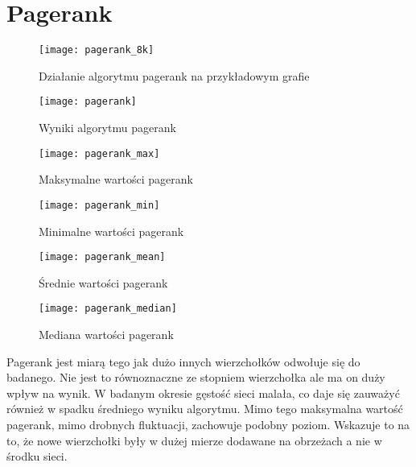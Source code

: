 \section{Pagerank}
\FloatBarrier\FloatBarrier
\begin{figure}[h]
	\centering
	\texttt{[image: pagerank\_8k]}
	\caption{Działanie algorytmu pagerank na przykładowym grafie}
\end{figure}
\FloatBarrier
\begin{figure}[h]
	\centering
	\texttt{[image: pagerank]}
	\caption{Wyniki algorytmu pagerank}
\end{figure}
\FloatBarrier\FloatBarrier
\begin{figure}[h]
	\centering
	\texttt{[image: pagerank\_max]}
	\caption{Maksymalne wartości pagerank}
\end{figure}
\FloatBarrier\FloatBarrier
\begin{figure}[h]
	\centering
	\texttt{[image: pagerank\_min]}
	\caption{Minimalne wartości pagerank}
\end{figure}
\FloatBarrier\FloatBarrier
\begin{figure}[h]
	\centering
	\texttt{[image: pagerank\_mean]}
	\caption{Średnie wartości pagerank}
\end{figure}
\FloatBarrier\FloatBarrier
\begin{figure}[h]
	\centering
	\texttt{[image: pagerank\_median]}
	\caption{Mediana wartości pagerank}
\end{figure}
Pagerank jest miarą tego jak dużo innych wierzchołków odwołuje się do badanego. Nie jest to równoznaczne ze stopniem wierzchołka ale ma on duży wpływ na wynik. W badanym okresie gęstość sieci malała, co daje się zauważyć również w spadku średniego wyniku algorytmu. Mimo tego maksymalna wartość pagerank, mimo drobnych fluktuacji, zachowuje podobny poziom. Wskazuje to na to, że nowe wierzchołki były w dużej mierze dodawane na obrzeżach a nie w środku sieci.
\FloatBarrier
\newpage